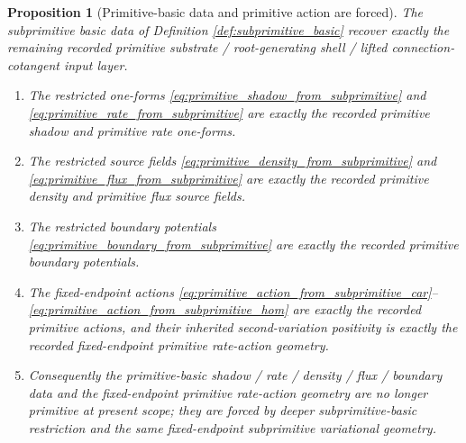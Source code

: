 \documentclass[11pt]{article}
\newtheorem{proposition}{Proposition}
\begin{document}
\begin{proposition}[Primitive-basic data and primitive action are forced]
\label{prop:primitive_basic_forced}
The subprimitive basic data of Definition \ref{def:subprimitive_basic} recover exactly the remaining recorded primitive substrate / root-generating shell / lifted connection-cotangent input layer.
\begin{enumerate}
    \item The restricted one-forms \eqref{eq:primitive_shadow_from_subprimitive} and \eqref{eq:primitive_rate_from_subprimitive} are exactly the recorded primitive shadow and primitive rate one-forms.
    \item The restricted source fields \eqref{eq:primitive_density_from_subprimitive} and \eqref{eq:primitive_flux_from_subprimitive} are exactly the recorded primitive density and primitive flux source fields.
    \item The restricted boundary potentials \eqref{eq:primitive_boundary_from_subprimitive} are exactly the recorded primitive boundary potentials.
    \item The fixed-endpoint actions \eqref{eq:primitive_action_from_subprimitive_car}--\eqref{eq:primitive_action_from_subprimitive_hom} are exactly the recorded primitive actions, and their inherited second-variation positivity is exactly the recorded fixed-endpoint primitive rate-action geometry.
    \item Consequently the primitive-basic shadow / rate / density / flux / boundary data and the fixed-endpoint primitive rate-action geometry are no longer primitive at present scope; they are forced by deeper subprimitive-basic restriction and the same fixed-endpoint subprimitive variational geometry.
\end{enumerate}
\end{proposition}
\end{document}

